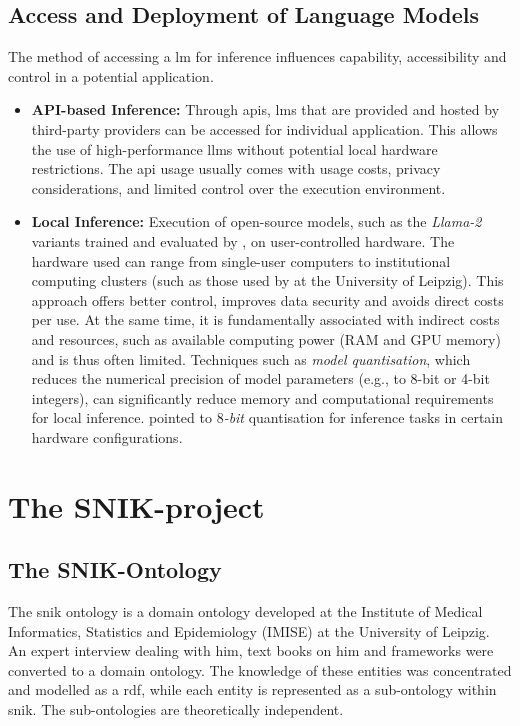 \subsection[Access and Deployment of LMs]{Access and Deployment of Language Models}
%
The method of accessing a \ac{lm} for inference influences capability, accessibility and control in a potential application.
%
\begin{itemize}
    \item \textbf{API-based Inference:} 
    Through \acp{api}, \acp{lm} that are provided and hosted by third-party providers can be accessed for individual application.
    This allows the use of high-performance \acp{llm} without potential local hardware restrictions.
    The \ac{api} usage usually comes with usage costs, privacy considerations, and limited control over the execution environment.
\item \textbf{Local Inference:}
    Execution of open-source models, such as the \textit{Llama-2} variants trained and evaluated by \citet{Paul_Keller}, on user-controlled hardware.
    The hardware used can range from single-user computers to institutional computing clusters (such as those used by \citeauthor{Paul_Keller} at the University of Leipzig). 
    This approach offers better control, improves data security and avoids direct costs per use.
    At the same time, it is fundamentally associated with indirect costs and resources, such as available computing power (RAM and GPU memory) and is thus often limited.
    Techniques such as \textit{model quantisation}, which reduces the numerical precision of model parameters (e.g., to 8-bit or 4-bit integers), can significantly reduce memory and computational requirements for local inference.
    \citet{Paul_Keller} pointed to \textit{$8$-bit} quantisation for inference tasks in certain hardware configurations.
\end{itemize}
%
\section{The SNIK-project}\label{sec:snik_project}
\subsection{The SNIK-Ontology}
%
The \ac{snik} ontology is a domain ontology developed at the Institute of Medical Informatics, Statistics and Epidemiology (IMISE) at the University of Leipzig.
An expert interview dealing with \ac{him}, text books on \ac{him} and frameworks were converted to a domain ontology.
The knowledge of these entities was concentrated and modelled as a \ac{rdf}, while each entity is represented as a sub-ontology within \ac{snik}.
The sub-ontologies are theoretically independent.
%
